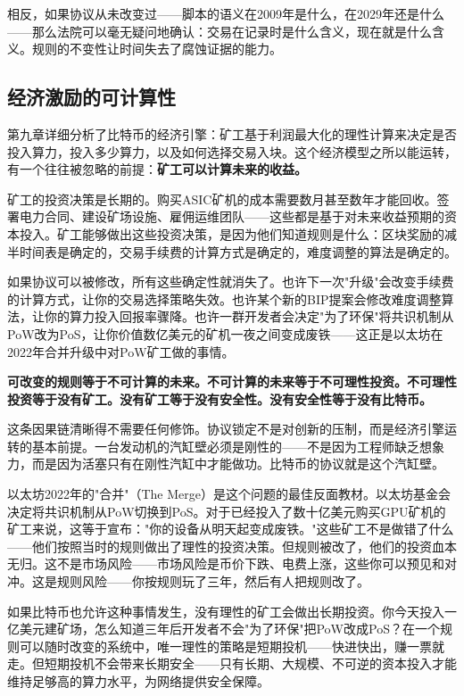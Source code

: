 \documentclass[a4paper,12pt,openany]{ctexbook}
\begin{document}
相反，如果协议从未改变过——脚本的语义在2009年是什么，在2029年还是什么——那么法院可以毫无疑问地确认：交易在记录时是什么含义，现在就是什么含义。规则的不变性让时间失去了腐蚀证据的能力。


\subsection*{经济激励的可计算性}


第九章详细分析了比特币的经济引擎：矿工基于利润最大化的理性计算来决定是否投入算力，投入多少算力，以及如何选择交易入块。这个经济模型之所以能运转，有一个往往被忽略的前提：\textbf{矿工可以计算未来的收益。}

矿工的投资决策是长期的。购买ASIC矿机的成本需要数月甚至数年才能回收。签署电力合同、建设矿场设施、雇佣运维团队——这些都是基于对未来收益预期的资本投入。矿工能够做出这些投资决策，是因为他们知道规则是什么：区块奖励的减半时间表是确定的，交易手续费的计算方式是确定的，难度调整的算法是确定的。

如果协议可以被修改，所有这些确定性就消失了。也许下一次"升级"会改变手续费的计算方式，让你的交易选择策略失效。也许某个新的BIP提案会修改难度调整算法，让你的算力投入回报率骤降。也许一群开发者会决定"为了环保"将共识机制从PoW改为PoS，让你价值数亿美元的矿机一夜之间变成废铁——这正是以太坊在2022年合并升级中对PoW矿工做的事情。

\textbf{可改变的规则等于不可计算的未来。不可计算的未来等于不可理性投资。不可理性投资等于没有矿工。没有矿工等于没有安全性。没有安全性等于没有比特币。}

这条因果链清晰得不需要任何修饰。协议锁定不是对创新的压制，而是经济引擎运转的基本前提。一台发动机的汽缸壁必须是刚性的——不是因为工程师缺乏想象力，而是因为活塞只有在刚性汽缸中才能做功。比特币的协议就是这个汽缸壁。

以太坊2022年的"合并"（The Merge）是这个问题的最佳反面教材。以太坊基金会决定将共识机制从PoW切换到PoS。对于已经投入了数十亿美元购买GPU矿机的矿工来说，这等于宣布："你的设备从明天起变成废铁。"这些矿工不是做错了什么——他们按照当时的规则做出了理性的投资决策。但规则被改了，他们的投资血本无归。这不是市场风险——市场风险是币价下跌、电费上涨，这些你可以预见和对冲。这是规则风险——你按规则玩了三年，然后有人把规则改了。

如果比特币也允许这种事情发生，没有理性的矿工会做出长期投资。你今天投入一亿美元建矿场，怎么知道三年后开发者不会"为了环保"把PoW改成PoS？在一个规则可以随时改变的系统中，唯一理性的策略是短期投机——快进快出，赚一票就走。但短期投机不会带来长期安全——只有长期、大规模、不可逆的资本投入才能维持足够高的算力水平，为网络提供安全保障。
\end{document}
